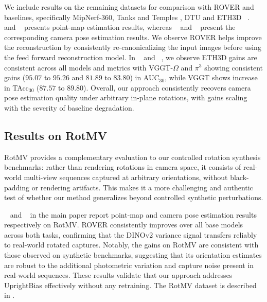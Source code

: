 We include results on the remaining datasets for comparison with ROVER and baselines, specifically MipNerf-360\citep{barron2022mipnerf360}, Tanks and Temples \cite{Knapitsch2017tanksandtemples}, DTU \cite{jensen2014largeDTU} and ETH3D ~\citep{Schops_2019_CVPRETH3D1, schoeps2017cvprETH3D2}. ~ and ~ presents point-map estimation results, whereas ~ and ~ present the corresponding camera pose estimation results. We observe ROVER helps improve the reconstruction by consistently re-canonicalizing the input images before using the feed forward reconstruction model. In ~ and ~, we observe ETH3D gains are consistent across all models and metrics with VGGT-$\Omega$ and $\pi^3$ showing consistent gains ($95.07$ to $95.26$ and $81.89$ to $83.80$) in AUC$_{30}$, while VGGT shows increase in TAcc$_{30}$ ($87.57$ to $89.80$). Overall, our approach consistently recovers camera pose estimation quality under arbitrary in-plane rotations, with gains scaling with the severity of baseline degradation.




\subsection{Results on RotMV}
\label{sec:rover_on_rotmv}
RotMV provides a complementary evaluation to our controlled rotation synthesis benchmarks: rather than rendering rotations in camera space, it consists of real-world multi-view sequences captured at arbitrary orientations, without black-padding or rendering artifacts. This makes it a more challenging and authentic test of whether our method generalizes beyond controlled synthetic perturbations.

~ and ~ in the main paper report point-map and camera pose estimation results respectively on RotMV. ROVER consistently improves over all base models across both tasks, confirming that the DINOv2 variance signal transfers reliably to real-world rotated captures. Notably, the gains on RotMV are consistent with those observed on synthetic benchmarks, suggesting that its orientation estimates are robust to the additional photometric variation and capture noise present in real-world sequences.
These results validate that our approach addresses UprightBias effectively without any retraining. The RotMV dataset is described in .

